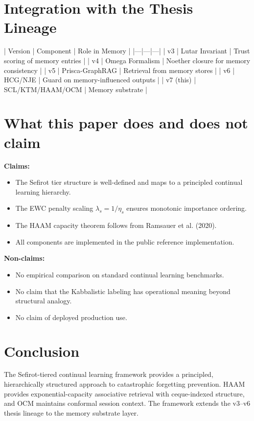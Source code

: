 \documentclass[11pt]{article}
\theoremstyle{plain}
\begin{document}
\section{Integration with the Thesis Lineage}

| Version | Component | Role in Memory |
|—|—|—|
| v3 | Lutar Invariant | Trust scoring of memory entries |
| v4 | Omega Formalism | Noether closure for memory consistency |
| v5 | Prisca-GraphRAG | Retrieval from memory stores |
| v6 | HCG/NJE | Guard on memory-influenced outputs |
| v7 (this) | SCL/KTM/HAAM/OCM | Memory substrate |


\section{What this paper does and does not claim}

\textbf{Claims:}
\begin{itemize}
  \item The Sefirot tier structure is well-defined and maps to a principled continual learning hierarchy.
  \item The EWC penalty scaling \( \lambda_s = 1/\eta_s \) ensures monotonic importance ordering.
  \item The HAAM capacity theorem follows from Ramsauer et al. (2020).
  \item All components are implemented in the public reference implementation.
\end{itemize}

\textbf{Non-claims:}
\begin{itemize}
  \item No empirical comparison on standard continual learning benchmarks.
  \item No claim that the Kabbalistic labeling has operational meaning beyond structural analogy.
  \item No claim of deployed production use.
\end{itemize}


\section{Conclusion}

The Sefirot-tiered continual learning framework provides a principled, hierarchically structured approach to catastrophic forgetting prevention. HAAM provides exponential-capacity associative retrieval with ceque-indexed structure, and OCM maintains conformal session context. The framework extends the v3–v6 thesis lineage to the memory substrate layer.
\end{document}
